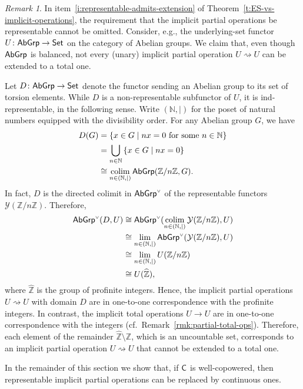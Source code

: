 \documentclass[a4paper,10pt,reqno]{amsart}
\theoremstyle{definition}
\theoremstyle{remark}
\newtheorem{remark}[theorem]{Remark}
\newcommand{\N}{\mathbb{N}}				%
\newcommand{\Z}{\mathbb{Z}}				%
\newcommand{\cat}{{\sf C}}								%
\newcommand{\Set}{{\sf Set}}							%
\newcommand{\AGrp}{{\sf AbGrp}}							%
\newcommand{\CP}[1]{{#1}^{\text{\tiny$\vee$}}}			%
\newcommand{\yo}{\mathcal{Y}}
\newcommand{\colim}{\operatornamewithlimits{colim}}		%
\begin{document}
\begin{remark}\label{rm:profinite-integers}
	In item~\ref{i:representable-admits-extension} of Theorem~\ref{t:ES-vs-implicit-operations}, the requirement that the implicit partial operations be representable cannot be omitted. Consider, e.g., the underlying-set functor $U\colon \AGrp\to \Set$ on the category of Abelian groups. We claim that, even though $\AGrp$ is balanced, not every (unary) implicit partial operation $U\rightsquigarrow U$ can be extended to a total one.
	
	Let $D\colon \AGrp\to \Set$ denote the functor sending an Abelian group to its set of torsion elements.
	While $D$ is a non-representable subfunctor of $U$, it is ind-representable, in the following sense. Write $(\N,\mid)$ for the poset of natural numbers equipped with the divisibility order. For any Abelian group $G$, we have
	\begin{align*}
	D(G) &= \{x\in G\mid nx=0 \text{ for some } n\in \N\} \\
	&= \bigcup_{n\in \N}{\{x\in G\mid nx=0\}} \\
	&\cong \colim_{n\in (\N,\mid)} \AGrp(\Z/n\Z,G).
	\end{align*}
	In fact, $D$ is the directed colimit in $\CP{\AGrp}$ of the representable functors $\yo(\Z/n\Z)$. Therefore,
	\begin{align*}
	\CP{\AGrp}(D,U) &\cong \CP{\AGrp}(\colim_{n\in (\N,\mid)}{\yo(\Z/n\Z)},U) \\
	&\cong \lim_{n\in (\N,\mid)}{\CP{\AGrp}(\yo(\Z/n\Z),U)} \\
	&\cong \lim_{n\in (\N,\mid)}{U(\Z/n\Z)} \\
	&\cong U(\widehat{\Z}),
	\end{align*}
	where $\widehat{\Z}$ is the group of profinite integers. Hence, the implicit partial operations $U\rightsquigarrow U$ with domain $D$ are in one-to-one correspondence with the profinite integers. In contrast, the implicit total operations $U\to U$ are in one-to-one correspondence with the integers (cf.\ Remark~\ref{rmk:partial-total-ops}). Therefore, each element of the remainder $\widehat{\Z}\setminus \Z$, which is an uncountable set, corresponds to an implicit partial operation $U\rightsquigarrow U$ that cannot be extended to a total one.
\end{remark}

In the remainder of this section we show that, if $\cat$ is well-copowered, then representable implicit partial operations can be replaced by continuous ones.
\end{document}
